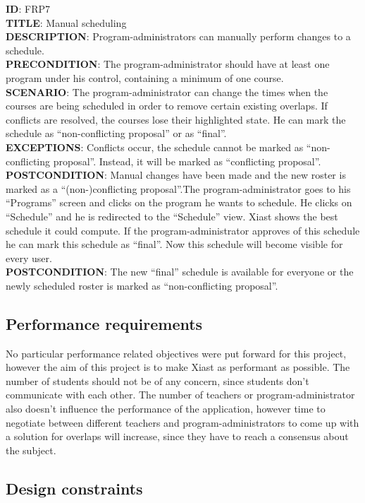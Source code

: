 \documentclass[9pt]{article}
\begin{document}
\textbf{ID}: FRP7\\\textbf{TITLE}: Manual
scheduling\\\textbf{DESCRIPTION}: Program-administrators can manually
perform changes to a schedule.\\\textbf{PRECONDITION}: The
program-administrator should have at least one program under his
control, containing a minimum of one course.\\\textbf{SCENARIO}: The
program-administrator can change the times when the courses are being
scheduled in order to remove certain existing overlaps. If conflicts are
resolved, the courses lose their highlighted state. He can mark the
schedule as ``non-conflicting proposal'' or as
``final''.\\\textbf{EXCEPTIONS}: Conflicts occur, the schedule cannot be
marked as ``non-conflicting proposal''. Instead, it will be marked as
``conflicting proposal''.\\\textbf{POSTCONDITION}: Manual changes have
been made and the new roster is marked as a ``(non-)conflicting
proposal''.The program-administrator goes to his ``Programs'' screen and
clicks on the program he wants to schedule. He clicks on ``Schedule''
and he is redirected to the ``Schedule'' view. Xiast shows the best
schedule it could compute. If the program-administrator approves of this
schedule he can mark this schedule as ``final''. Now this schedule will
become visible for every user.\\\textbf{POSTCONDITION}: The new
``final'' schedule is available for everyone or the newly scheduled
roster is marked as ``non-conflicting proposal''.

\subsection{Performance
requirements}\label{performance-requirements}

No particular performance related objectives were put forward for this
project, however the aim of this project is to make Xiast as performant
as possible. The number of students should not be of any concern, since
students don't communicate with each other. The number of teachers or
program-administrator also doesn't influence the performance of the
application, however time to negotiate between different teachers and
program-administrators to come up with a solution for overlaps will
increase, since they have to reach a consensus about the subject.

\subsection{Design constraints}\label{design-constraints}
\end{document}
